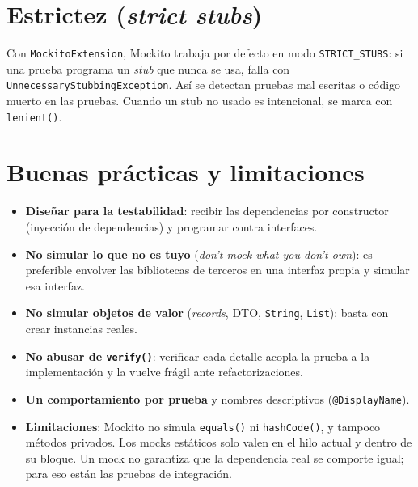 \documentclass[11pt,a4paper,oneside]{report}
\newcommand{\code}[1]{\texttt{#1}}
\begin{document}
\section{Estrictez (\emph{strict stubs})}
Con \code{MockitoExtension}, Mockito trabaja por defecto en modo \code{STRICT\_STUBS}: si una prueba programa un \emph{stub} que nunca se usa, falla con \code{UnnecessaryStubbingException}. Así se detectan pruebas mal escritas o código muerto en las pruebas. Cuando un stub no usado es intencional, se marca con \code{lenient()}.

\section{Buenas prácticas y limitaciones}
\begin{itemize}
  \item \textbf{Diseñar para la testabilidad}: recibir las dependencias por constructor (inyección de dependencias) y programar contra interfaces.
  \item \textbf{No simular lo que no es tuyo} (\emph{don't mock what you don't own}): es preferible envolver las bibliotecas de terceros en una interfaz propia y simular esa interfaz.
  \item \textbf{No simular objetos de valor} (\emph{records}, DTO, \code{String}, \code{List}): basta con crear instancias reales.
  \item \textbf{No abusar de \code{verify()}}: verificar cada detalle acopla la prueba a la implementación y la vuelve frágil ante refactorizaciones.
  \item \textbf{Un comportamiento por prueba} y nombres descriptivos (\code{@DisplayName}).
  \item \textbf{Limitaciones}: Mockito no simula \code{equals()} ni \code{hashCode()}, y tampoco métodos privados. Los mocks estáticos solo valen en el hilo actual y dentro de su bloque. Un mock no garantiza que la dependencia real se comporte igual; para eso están las pruebas de integración.
\end{itemize}
\end{document}
